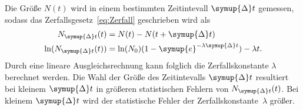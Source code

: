 Die Größe $N(t)$ wird in einem bestimmten Zeitintevall $\symup{\Delta}t$ gemessen, sodass das 
Zerfallsgesetz~\eqref{eq:Zerfall} geschrieben wird als
\begin{align*}
    N_{\symup{\Delta }t}(t) &= N(t) - N(t+\symup{\Delta} t) \\
    \ln(N_{\symup{\Delta }t}(t)) &= \ln(N_0)(1-\symup{e}^{-\lambda \symup{\Delta}t})-\lambda t.
\end{align*}
Durch eine lineare Ausgleichsrechnung kann folglich die Zerfallskonstante $\lambda$ berechnet werden.
Die Wahl der Größe des Zeitintevalls $\symup{\Delta}t$ resultiert bei kleinem $\symup{\Delta}t$ in größeren
statistischen Fehlern von $N_{\symup{\Delta }t}(t)$. Bei kleinem $\symup{\Delta}t$ wird der statistische Fehler
der Zerfallskonstante~$\lambda$ größer.